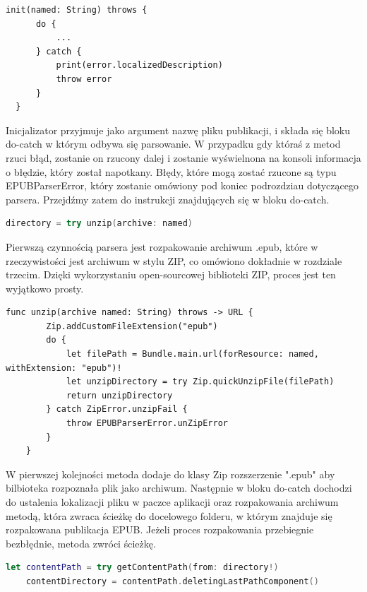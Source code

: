 \begin{lstlisting}[language=swift-reference]
  init(named: String) throws {
      do {
          ...
      } catch {
          print(error.localizedDescription)
          throw error
      }
  }
\end{lstlisting}

Inicjalizator przyjmuje jako argument nazwę pliku publikacji, i składa się bloku do-catch w którym odbywa się parsowanie. W przypadku gdy któraś z metod rzuci błąd, zostanie on rzucony dalej i zostanie wyświelnona na konsoli informacja o błędzie, który został napotkany. Błędy, które mogą zostać rzucone są typu EPUBParserError, który zostanie omówiony pod koniec podrozdziau dotyczącego parsera. Przejdźmy zatem do instrukcji znajdujących się w bloku do-catch.

\begin{lstlisting}[firstnumber=11, language=swift]
    directory = try unzip(archive: named)
\end{lstlisting}

Pierwszą czynnością parsera jest rozpakowanie archiwum .epub, które w rzeczywistości jest archiwum w stylu ZIP, co omówiono dokładnie w rozdziale trzecim. Dzięki wykorzystaniu open-sourcowej biblioteki ZIP, proces jest ten wyjątkowo prosty.

\begin{lstlisting}[caption={Implementacja metody unzip(archive named:).},language=swift-reference]
    func unzip(archive named: String) throws -> URL {
        Zip.addCustomFileExtension("epub")
        do {
            let filePath = Bundle.main.url(forResource: named, withExtension: "epub")!
            let unzipDirectory = try Zip.quickUnzipFile(filePath)
            return unzipDirectory
        } catch ZipError.unzipFail {
            throw EPUBParserError.unZipError
        }
    }
\end{lstlisting}

W pierwszej kolejności metoda dodaje do klasy Zip rozszerzenie ".epub" aby bilbioteka rozpoznała plik jako archiwum. Następnie w bloku do-catch dochodzi do ustalenia lokalizacji pliku w paczce aplikacji oraz rozpakowania archiwum metodą, która zwraca ścieżkę do docelowego folderu, w którym znajduje się rozpakowana publikacja EPUB. Jeżeli proces rozpakowania przebiegnie bezbłędnie, metoda zwróci ścieżkę.

\begin{lstlisting}[firstnumber=12, language=swift]
    let contentPath = try getContentPath(from: directory!)
    contentDirectory = contentPath.deletingLastPathComponent()
\end{lstlisting}

